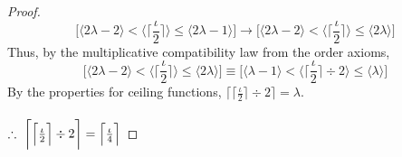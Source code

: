 \documentclass[preview]{standalone}
\begin{document}
\begin{proof}
    \begin{equation*}
        \bigg[
            \Big \langle 2 \lambda - 2 \Big \rangle
                < 
            \Big \langle \Big \lceil \frac{\iota}{2} \Big \rceil \Big \rangle
                \le 
            \Big \langle 2 \lambda - 1\Big \rangle
        \bigg]
            \rightarrow
        \bigg[
            \Big \langle 2 \lambda - 2 \Big \rangle
                < 
            \Big \langle \Big \lceil \frac{\iota}{2} \Big \rceil \Big \rangle
                \le 
            \Big \langle 2 \lambda \Big \rangle
        \bigg]
    \end{equation*}
    Thus, by the multiplicative compatibility law from the order axioms,
    \begin{equation*}
        \bigg[
            \Big \langle 2 \lambda - 2 \Big \rangle
                < 
            \Big \langle \Big \lceil \frac{\iota}{2} \Big \rceil \Big \rangle
                \le 
            \Big \langle 2 \lambda \Big \rangle
        \bigg]
            \equiv
        \bigg[
            \Big \langle \lambda - 1 \Big \rangle
                < 
            \Big \langle \Big \lceil \frac{\iota}{2} \Big \rceil \div 2 \Big \rangle
                \le 
            \Big \langle \lambda \Big \rangle
        \bigg]
    \end{equation*}
    By the properties for ceiling functions, 
    $\big \lceil \big \lceil \frac{\iota}{2} \big \rceil \div 2 \big \rceil = \lambda$.
    \\ \\
    $\therefore \text{\space} \relax{
        \bigg \lceil \Big \lceil \frac{\iota}{2} \Big \rceil \div 2 \bigg \rceil 
            = 
        \Big \lceil \frac{\iota}{4} \Big \rceil
    }$
\color{lightgray} \end{proof}
\end{document}
